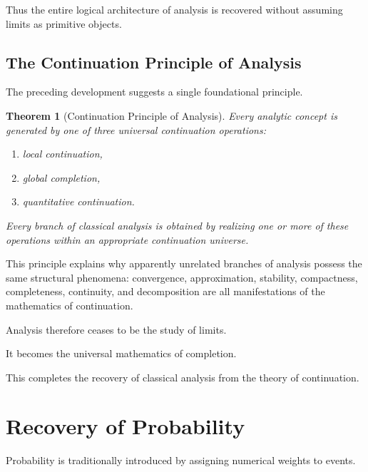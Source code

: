 \documentclass[13pt,openany]{book}
\theoremstyle{plain}
\newtheorem{theorem}{Theorem}[chapter]
\theoremstyle{definition}
\begin{document}
Thus the entire logical architecture of analysis is recovered without assuming
limits as primitive objects.

\section{The Continuation Principle of Analysis}

The preceding development suggests a single foundational principle.

\begin{theorem}[Continuation Principle of Analysis]
Every analytic concept is generated by one of three universal continuation
operations:

\begin{enumerate}
    \item local continuation,
    \item global completion,
    \item quantitative continuation.
\end{enumerate}

Every branch of classical analysis is obtained by realizing one or more of
these operations within an appropriate continuation universe.
\end{theorem}

This principle explains why apparently unrelated branches of analysis possess
the same structural phenomena: convergence, approximation, stability,
compactness, completeness, continuity, and decomposition are all manifestations
of the mathematics of continuation.

Analysis therefore ceases to be the study of limits.

It becomes the universal mathematics of completion.

This completes the recovery of classical analysis from the theory of
continuation.

\chapter{Recovery of Probability}

Probability is traditionally introduced by assigning numerical weights to
events.
\end{document}

